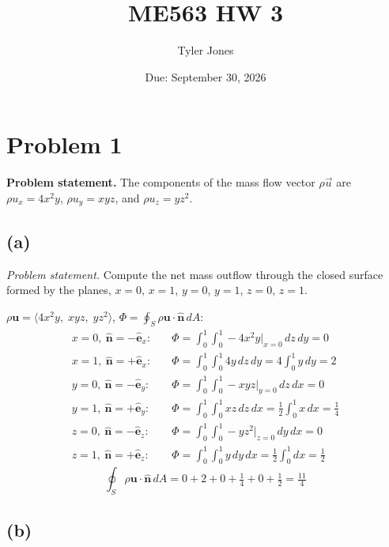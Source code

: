 \documentclass[11pt]{article}
\title{\vspace{-1.5em}\textbf{ME563 HW 3}}
\author{Tyler Jones}
\date{Due: September 30, 2026}
\newcommand{\vect}[1]{\mathbf{#1}}
\begin{document}
\maketitle
\thispagestyle{fancy}

\section*{Problem 1}

\noindent\textbf{Problem statement.} The components of the mass flow vector $\rho\vec u$ are
$\rho u_x = 4x^2y$, $\rho u_y = xyz$, and $\rho u_z = yz^2$.

\subsection*{(a)}

\noindent\textit{Problem statement.} Compute the net mass outflow through the closed surface formed
by the planes, $x=0$, $x=1$, $y=0$, $y=1$, $z=0$, $z=1$.

\medskip
\noindent $\rho\vect u = \langle 4x^2y,\; xyz,\; yz^2\rangle$, $\Phi = \oint_S \rho\vect u\cdot\hat{\vect n}\,dA$:
\begin{align*}
x=0,\ \hat{\vect n}=-\hat{\vect e}_x:&\quad \Phi = \int_0^1\!\!\int_0^1 -4x^2y\big|_{x=0}\,dz\,dy = 0 \\
x=1,\ \hat{\vect n}=+\hat{\vect e}_x:&\quad \Phi = \int_0^1\!\!\int_0^1 4y\,dz\,dy = 4\int_0^1 y\,dy = 2 \\
y=0,\ \hat{\vect n}=-\hat{\vect e}_y:&\quad \Phi = \int_0^1\!\!\int_0^1 -xyz\big|_{y=0}\,dz\,dx = 0 \\
y=1,\ \hat{\vect n}=+\hat{\vect e}_y:&\quad \Phi = \int_0^1\!\!\int_0^1 xz\,dz\,dx = \tfrac12\int_0^1 x\,dx = \tfrac14 \\
z=0,\ \hat{\vect n}=-\hat{\vect e}_z:&\quad \Phi = \int_0^1\!\!\int_0^1 -yz^2\big|_{z=0}\,dy\,dx = 0 \\
z=1,\ \hat{\vect n}=+\hat{\vect e}_z:&\quad \Phi = \int_0^1\!\!\int_0^1 y\,dy\,dx = \tfrac12\int_0^1 dx = \tfrac12
\end{align*}
\begin{equation*}
\boxed{\oint_S \rho\vect u\cdot\hat{\vect n}\,dA = 0 + 2 + 0 + \tfrac14 + 0 + \tfrac12 = \tfrac{11}{4}}
\end{equation*}

\subsection*{(b)}
\end{document}
